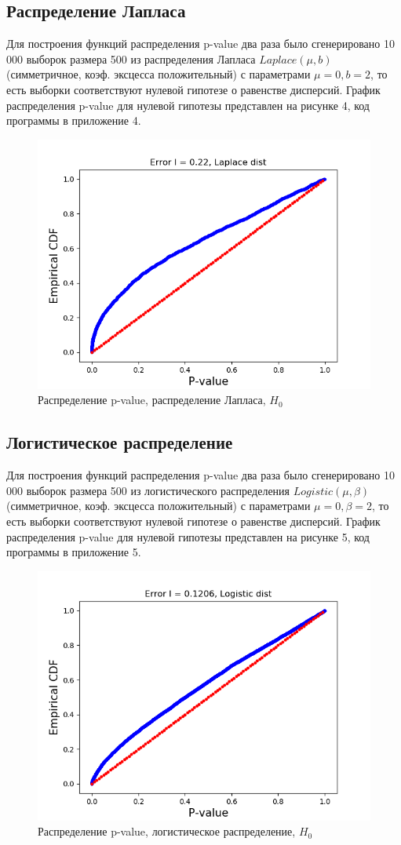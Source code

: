 \documentclass[12pt]{disser}
\begin{document}
\subsection*{Распределение Лапласа}
 Для построения функций распределения p-value два раза было сгенерировано 10 000 выборок размера 500 из распределения Лапласа $Laplace(\mu, b)$ (симметричное, коэф. эксцесса положительный) с параметрами $\mu = 0, b = 2$, то есть выборки соответствуют нулевой гипотезе о равенстве дисперсий. График распределения p-value для нулевой гипотезы представлен на рисунке 4, код программы в приложение 4.
\begin{figure}[hbt!]
	\centering
	\includegraphics[width=0.8\linewidth]{Pvalue_laplace_h0.png}
	\caption{Распределение p-value, распределение Лапласа, $H_0$}
	\label{fig:mpr}
	
\end{figure}
\subsection*{Логистическое распределение}
 Для построения функций распределения p-value два раза было сгенерировано 10 000 выборок размера 500 из логистического распределения $Logistic(\mu, \beta)$ (симметричное, коэф. эксцесса положительный) с параметрами $\mu = 0, \beta = 2$, то есть выборки соответствуют нулевой гипотезе о равенстве дисперсий. График распределения p-value для нулевой гипотезы представлен на рисунке 5, код программы в приложение 5.
\begin{figure}[hbt!]
	\centering
	\includegraphics[width=0.8\linewidth]{Pvalue_logistic_h0.png}
	\caption{Распределение p-value, логистическое распределение, $H_0$}
	\label{fig:mpr}
\end{figure}
\end{document}
